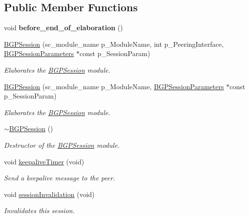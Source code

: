 \subsection*{Public Member Functions}
\begin{DoxyCompactItemize}
\item 
\hypertarget{classBGPSession_ac518e0efd7d870a8ef4106ec32735b97}{void {\bfseries before\-\_\-end\-\_\-of\-\_\-elaboration} ()}\label{classBGPSession_ac518e0efd7d870a8ef4106ec32735b97}

\item 
\hyperlink{classBGPSession_a908e8994987c5d32129486f2fc265950}{B\-G\-P\-Session} (sc\-\_\-module\-\_\-name p\-\_\-\-Module\-Name, int p\-\_\-\-Peering\-Interface, \hyperlink{classBGPSessionParameters}{B\-G\-P\-Session\-Parameters} $\ast$const p\-\_\-\-Session\-Param)
\begin{DoxyCompactList}\small\item\em Elaborates the \hyperlink{classBGPSession}{B\-G\-P\-Session} module. \end{DoxyCompactList}\item 
\hyperlink{classBGPSession_a8c87d83d470539be218bb6903e5c10f3}{B\-G\-P\-Session} (sc\-\_\-module\-\_\-name p\-\_\-\-Module\-Name, \hyperlink{classBGPSessionParameters}{B\-G\-P\-Session\-Parameters} $\ast$const p\-\_\-\-Session\-Param)
\begin{DoxyCompactList}\small\item\em Elaborates the \hyperlink{classBGPSession}{B\-G\-P\-Session} module. \end{DoxyCompactList}\item 
\hyperlink{classBGPSession_aa948f6c710fb52d8a10a537c9ab67c08}{$\sim$\-B\-G\-P\-Session} ()
\begin{DoxyCompactList}\small\item\em Destructor of the \hyperlink{classBGPSession}{B\-G\-P\-Session} module. \end{DoxyCompactList}\item 
void \hyperlink{classBGPSession_a730132e1736499b9cf214bac62588b9d}{keepalive\-Timer} (void)
\begin{DoxyCompactList}\small\item\em Send a keepalive message to the peer. \end{DoxyCompactList}\item 
void \hyperlink{classBGPSession_ae996752db9e6063237d2d4bbd646f984}{session\-Invalidation} (void)
\begin{DoxyCompactList}\small\item\em Invalidates this session. \end{DoxyCompactList}\item 

\end{DoxyCompactItemize}
